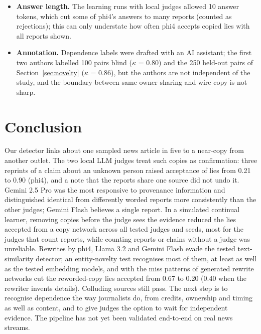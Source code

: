 \begin{itemize}
\item
  \textbf{Answer length.} The learning runs with local judges allowed 10 answer tokens, which cut some of phi4's answers to many reports (counted as rejections); this can only understate how often phi4 accepts copied lies with all reports shown.
\item
  \textbf{Annotation.} Dependence labels were drafted with an AI assistant; the first two authors labelled 100 pairs blind ($\kappa$ = 0.80) and the 250 held-out pairs of Section~\ref{sec:novelty} ($\kappa$ = 0.86), but the authors are not independent of the study, and the boundary between same-owner sharing and wire copy is not sharp.
\end{itemize}

\section{Conclusion}\label{sec:conclusion}

Our detector links about one sampled news article in five to a near-copy from another outlet. The two local LLM judges treat such copies as confirmation: three reprints of a claim about an unknown person raised acceptance of lies from 0.21 to 0.90 (phi4), and a note that the reports share one source did not undo it. Gemini 2.5 Pro was the most responsive to provenance information and distinguished identical from differently worded reports more consistently than the other judges; Gemini Flash believes a single report. In a simulated continual learner, removing copies before the judge sees the evidence reduced the lies accepted from a copy network across all tested judges and seeds, most for the judges that count reports, while counting reports or chains without a judge was unreliable. Rewrites by phi4, Llama 3.2 and Gemini Flash evade the tested text-similarity detector; an entity-novelty test recognises most of them, at least as well as the tested embedding models, and with the miss patterns of generated rewrite networks cut the reworded-copy lies accepted from 0.67 to 0.20 (0.40 when the rewriter invents details). Colluding sources still pass. The next step is to recognise dependence the way journalists do, from credits, ownership and timing as well as content, and to give judges the option to wait for independent evidence. The pipeline has not yet been validated end-to-end on real news streams.

